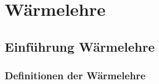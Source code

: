 
\newpage
\section{Wärmelehre}
	\subsection{Einführung Wärmelehre}
	\subsubsection{Definitionen der Wärmelehre}\label{DefinitionenDerWaermelehre}
